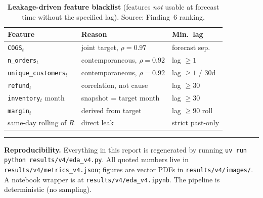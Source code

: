 \documentclass[10pt,a4paper,twocolumn]{article}
\begin{document}
\begin{table}[h]
  \scriptsize
  \caption{\textbf{Leakage-driven feature blacklist} (features \emph{not} usable at forecast time without the specified lag). Source: Finding~6 ranking.}
  \label{tab:blacklist}
  \begin{tabular}{@{}l p{2.4cm} l@{}}
    \toprule
    \textbf{Feature} & \textbf{Reason} & \textbf{Min.\ lag} \\
    \midrule
    \texttt{COGS}$_t$              & joint target, $\rho{=}0.97$ & forecast sep. \\
    \texttt{n\_orders}$_t$         & contemporaneous, $\rho{=}0.92$ & lag $\ge 1$ \\
    \texttt{unique\_customers}$_t$ & contemporaneous, $\rho{=}0.92$ & lag $\ge 1$ / 30d \\
    \texttt{refund}$_t$            & correlation, not cause & lag $\ge 30$ \\
    \texttt{inventory}$_t$ month   & snapshot = target month & lag $\ge 30$ \\
    \texttt{margin}$_t$            & derived from target & lag $\ge 90$ roll \\
    same-day rolling of $R$        & direct leak & strict past-only \\
    \bottomrule
  \end{tabular}
\end{table}

\vspace{2pt}\hrule\vspace{2pt}
{\scriptsize\noindent\textbf{Reproducibility.} Everything in this report is regenerated by running \texttt{uv run python results/v4/eda\_v4.py}. All quoted numbers live in \texttt{results/v4/metrics\_v4.json}; figures are vector PDFs in \texttt{results/v4/images/}. A notebook wrapper is at \texttt{results/v4/eda\_v4.ipynb}. The pipeline is deterministic (no sampling).}
\end{document}
